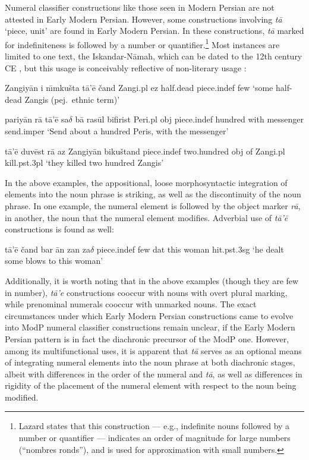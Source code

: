 \documentclass[11pt]{article}
\begin{document}
Numeral classifier constructions like those seen in Modern Persian are not attested in Early Modern Persian. However, some constructions involving {\it t\=a} `piece, unit' are found in Early Modern Persian. 
In these constructions, {\it t\=a} marked for indefiniteness is followed by a number or quantifier.\footnote{Lazard states that this construction --- e.g., indefinite nouns followed by a number or quantifier --- indicates an order of magnitude for large numbers (``nombres ronds''), and is used for approximation with small numbers.} 
Most instances are limited to one text, 
the Iskandar-N\=amah, %
which can be dated to the %
12th century CE \citep[127]{Lazard1963}, but this usage is conceivably reflective of non-literary usage \citep[217--218]{Lazard1963}:
\begin{examples}
\item \gll Zangiy\=an i n\={\i}mku\v{s}ta t\=a'\=e \v{c}and
Zangi.{\sc pl} {\sc ez} half.dead piece.{\sc indef} few
\glt `some half-dead Zangis (pej.\ ethnic term)'
\glend
\item \gll pariy\=an r\=a t\=a'\=e sa$\delta$ b\=a ras\=ul bifirist
Peri.{\sc pl} {\sc obj} piece.{\sc indef} hundred with messenger send.{\sc imper}
\glt `Send about a hundred Peris, with the messenger'
\glend
\item \gll t\=a'\=e duv\=est r\=a az Zangiy\=an biku\v{s}tand
piece.{\sc indef} two.hundred {\sc obj} of Zangi.{\sc pl} kill.{\sc pst}.{\sc 3pl}
\glt `they killed two hundred Zangis'
\glend
\label{200Z}
\end{examples}
In the above examples, the appositional, loose morphosyntactic integration of elements into the noun phrase is striking, as well as the discontinuity of the noun phrase.
In one example, the numeral element is followed by the object marker {\it r\=a}, in another, the noun that the numeral element modifies.
Adverbial use of {\it t\=a'\=e} constructions is found as well:
\begin{examples}
\item \gll t\=a'\=e \v{c}and bar \=an zan za$\delta$
piece.{\sc indef} few {\sc dat} this woman hit.{\sc pst}.{\sc 3sg}
\glt `he dealt some blows to this woman'
\glend
\end{examples}
Additionally, it is worth noting that in the above examples (though they are few in number), {\it t\=a'e} constructions cooccur with nouns with overt plural marking, while prenominal numerals cooccur with unmarked nouns.
The exact circumstances under which Early Modern Persian constructions came to evolve into ModP numeral classifier constructions remain unclear, if the Early Modern Persian pattern is in fact the diachronic precursor of the ModP one.
However, among its multifunctional uses, it is apparent that {\it t\=a} serves as an optional means of integrating numeral elements into the noun phrase at both diachronic stages, albeit with differences in the order of the numeral and {\it t\=a}, as well as differences in rigidity of the placement of the numeral element with respect to the noun being modified.
\end{document}
